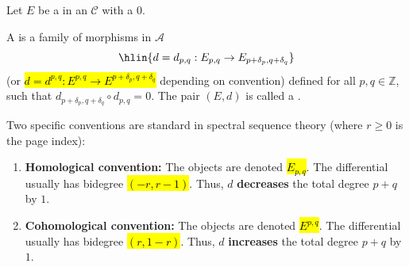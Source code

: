 \begin{definition} \label{definition:differential_on_a_bigraded_object_in_a_category_with_a_zero_object}
    Let $E$ be a  in an  $\mathcal{C}$ with a  $0$. 
    
    A  is a family of morphisms in $\mathcal{A}$
    $$\hlin{d = d_{p,q}: E_{p,q} \to E_{p+\delta_p, q+\delta_q}}$$
    (or \hl{$d = d^{p,q}: E^{p,q} \to E^{p+\delta_p, q+\delta_q}$} depending on convention) defined for all $p,q \in \mathbb{Z}$, such that $d_{p+\delta_p, q+\delta_q} \circ d_{p,q} = 0$. The pair $(E, d)$ is called a .
    
    Two specific conventions are standard in spectral sequence theory (where $r \ge 0$ is the page index):
    \begin{enumerate}
        \item \textbf{Homological convention:} The objects are denoted \hl{$E_{p,q}$}. The differential usually has bidegree \hl{$(-r, r-1)$}. Thus, $d$ \textbf{decreases} the total degree $p+q$ by $1$.
        
        \item \textbf{Cohomological convention:} The objects are denoted \hl{$E^{p,q}$}. The differential usually has bidegree \hl{$(r, 1-r)$}. Thus, $d$ \textbf{increases} the total degree $p+q$ by $1$.
    \end{enumerate}
\end{definition}